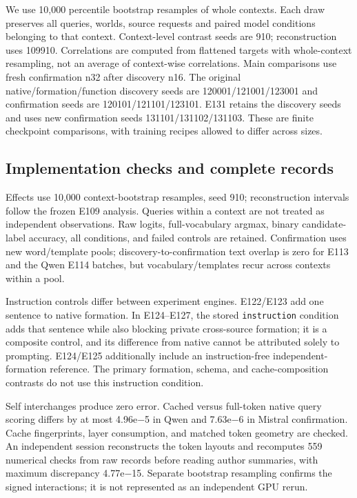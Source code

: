 \documentclass[11pt]{article}
\begin{document}
We use 10,000 percentile bootstrap resamples of whole contexts. Each draw preserves all queries, worlds, source requests and paired model conditions belonging to that context. Context-level contrast seeds are 910; reconstruction uses 109910. Correlations are computed from flattened targets with whole-context resampling, not an average of context-wise correlations. Main comparisons use fresh confirmation n32 after discovery n16. The original native/formation/function discovery seeds are 120001/121001/123001 and confirmation seeds are 120101/121101/123101. E131 retains the discovery seeds and uses new confirmation seeds 131101/131102/131103. These are finite checkpoint comparisons, with training recipes allowed to differ across sizes.

\subsection{Implementation checks and complete records}\label{implementation-checks-and-complete-records}

Effects use 10,000 context-bootstrap resamples, seed 910; reconstruction intervals follow the frozen E109 analysis. Queries within a context are not treated as independent observations. Raw logits, full-vocabulary argmax, binary candidate-label accuracy, all conditions, and failed controls are retained. Confirmation uses new word/template pools; discovery-to-confirmation text overlap is zero for E113 and the Qwen E114 batches, but vocabulary/templates recur across contexts within a pool.

Instruction controls differ between experiment engines. E122/E123 add one sentence to native formation. In E124--E127, the stored \texttt{instruction} condition adds that sentence while also blocking private cross-source formation; it is a composite control, and its difference from native cannot be attributed solely to prompting. E124/E125 additionally include an instruction-free independent-formation reference. The primary formation, schema, and cache-composition contrasts do not use this instruction condition.

Self interchanges produce zero error. Cached versus full-token native query scoring differs by at most 4.96e−5 in Qwen and 7.63e−6 in Mistral confirmation. Cache fingerprints, layer consumption, and matched token geometry are checked. An independent session reconstructs the token layouts and recomputes 559 numerical checks from raw records before reading author summaries, with maximum discrepancy 4.77e−15. Separate bootstrap resampling confirms the signed interactions; it is not represented as an independent GPU rerun.
\end{document}
